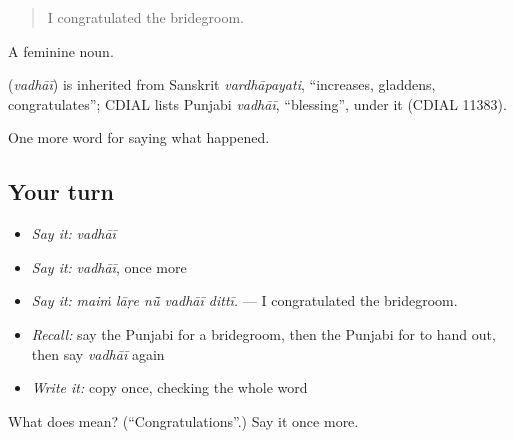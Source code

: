 \begin{quote}
I congratulated the bridegroom.
\end{quote}

A feminine noun.

\begin{cousinweb}
\textbf{} (\emph{vadhāī}) is inherited from Sanskrit \emph{vardhāpayati}, \textquotedblleft{}increases, gladdens, congratulates\textquotedblright{}; CDIAL lists Punjabi \emph{vadhāī}, \textquotedblleft{}blessing\textquotedblright{}, under it (CDIAL 11383).
\end{cousinweb}

\begin{grammarlens}[title={What you've built}]
One more word for saying what happened.
\end{grammarlens}

\subsection*{Your turn}
\begin{itemize}
\raggedright
  \item \emph{Say it:} \emph{vadhāī}
  \item \emph{Say it:} \emph{vadhāī}, once more
  \item \emph{Say it:} \emph{maiṁ lāṛe nū̃ vadhāī dittī.} — I congratulated the bridegroom.
  \item \emph{Recall:} say the Punjabi for a bridegroom, then the Punjabi for to hand out, then say \emph{vadhāī} again
  \item \emph{Write it:} copy \textbf{} once, checking the whole word
\end{itemize}

\begin{tcolorbox}[breakable,colback=teal!4,colframe=teal!35!black,title={Before you move on}]
What does  mean? (\textquotedblleft{}Congratulations\textquotedblright{}.) Say it once more.
\end{tcolorbox}
